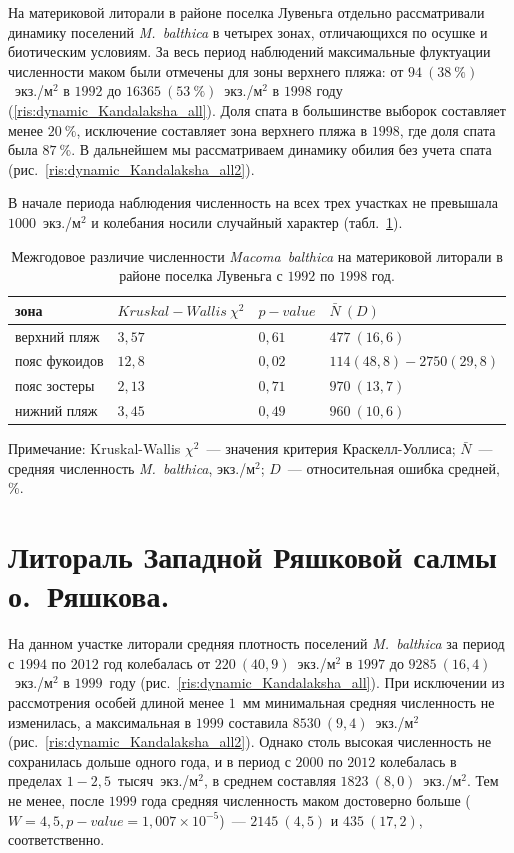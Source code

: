 На материковой литорали в районе поселка Лувеньга отдельно рассматривали динамику поселений {\it M.~balthica} в четырех зонах, отличающихся по осушке и биотическим условиям.
За весь период наблюдений максимальные флуктуации численности маком были отмечены для зоны верхнего пляжа: от $94~(38~\%)$~экз./м$^2$ в $1992$ до $16365~(53~\%)$~экз./м$^2$ в $1998$ году (\ref{ris:dynamic_Kandalaksha_all}). 
Доля спата в большинстве выборок составляет менее $20~\%$, исключение составляет зона верхнего пляжа в $1998$, где доля спата была $87~\%$.
В дальнейшем мы рассматриваем динамику обилия без учета спата (рис.~\ref{ris:dynamic_Kandalaksha_all2}).

В начале периода наблюдения численность на всех трех участках не превышала $1000$~экз./м$^2$ и колебания носили случайный характер (табл.~\ref{tab:2razrez_N2_Kruskal}).

	\begin{table}[p]
	\caption{Межгодовое различие численности {\it Macoma~balthica} на материковой литорали в районе поселка Лувеньга с $1992$ по $1998$ год.}
	\label{tab:2razrez_N2_Kruskal}
	\begin{tabularx}{\textwidth}{|*{4}{X|}} \hline
	зона & $Kruskal-Wallis\ \chi^2$ & $p-value$ & $\bar{N} ~ (D)$ \\ 
	\hline
	верхний пляж & $3,57$ & $0,61$ & $477~(16,6)$ \\
	\hline
	пояс фукоидов & $12,8$ & $0,02$ & $114 (48,8) - 2750 (29,8)$\\
	\hline
	пояс зостеры & $2,13$ & $0,71$ & $970~(13,7)$ \\
	\hline
	нижний пляж & $3,45$ & $0,49$ & $960~(10,6)$ \\
	\hline
	\end{tabularx}
	{\footnotesize Примечание: Kruskal-Wallis $\chi^2$~--- значения критерия Краскелл-Уоллиса; $\bar{N}$~--- средняя численность {\it 	M.~balthica}, экз./м$^2$; $D$~--- относительная ошибка средней, \%.}
	\end{table}


		\section{Литораль Западной Ряшковой салмы о.~Ряшкова.}

На данном участке литорали средняя плотность поселений {\it M.~balthica} за период с $1994$ по $2012$ год колебалась от $220~(40,9)$~экз./м$^2$ в $1997$ до $9285~(16,4)$~экз./м$^2$ в $1999$~году (рис.~\ref{ris:dynamic_Kandalaksha_all}).
При исключении из рассмотрения особей длиной менее $1$~мм минимальная средняя численность не изменилась, а максимальная в $1999$ составила $8530~(9,4)$~экз./м$^2$ (рис.~\ref{ris:dynamic_Kandalaksha_all2}).
Однако столь высокая численность не сохранилась дольше одного года, и в период с $2000$ по $2012$ колебалась в пределах $1 - 2,5$~тысяч~экз./м$^2$, в среднем составляя $1823~(8,0)$~экз./м$^2$.
Тем не менее, после $1999$ года средняя численность маком достоверно больше ($W = 4,5, p-value = 1,007 \times 10^{-5}$)~--- $2145~(4,5)$ и $435~(17,2)$, соответственно.

